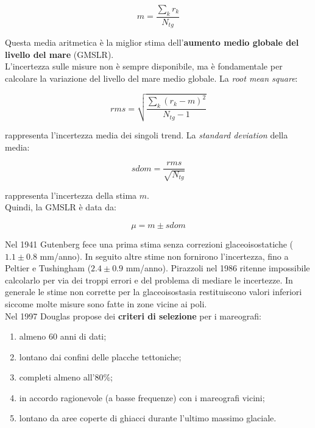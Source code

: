 \documentclass[a4paper,12pt]{book}
\begin{document}
\begin{equation}
    m=\frac{\sum_kr_k}{N_{tg}}
\end{equation}

\noindent
Questa media aritmetica è la miglior stima dell'\textbf{aumento medio globale del livello del mare} (GMSLR).\\

\noindent
L'incertezza sulle misure non è sempre disponibile, ma è fondamentale per calcolare la variazione del livello del mare medio globale.
La \textit{root mean square}:

\begin{equation}
    rms = \sqrt{\frac{\sum_k (r_k - m)^2}{N_{tg} - 1}}
\end{equation}

\noindent
rappresenta l'incertezza media dei singoli trend.
La \textit{standard deviation} della media:

\begin{equation}
    sdom=\frac{rms}{\sqrt{N_{tg}}}
\end{equation}

\noindent
rappresenta l'incertezza della stima $m$.\\

\noindent
Quindi, la GMSLR è data da:

\begin{equation}
    \mu = m \pm sdom
\end{equation}

\noindent
Nel 1941 Gutenberg fece una prima stima senza correzioni glaceoisostatiche ($1.1 \pm 0.8$ mm/anno).
In seguito altre stime non fornirono l'incertezza, fino a Peltier e Tushingham ($2.4 \pm 0.9$ mm/anno).
Pirazzoli nel 1986 ritenne impossibile calcolarlo per via dei troppi errori e del problema di mediare le incertezze.
In generale le stime non corrette per la glaceoisostasia restituiscono valori inferiori siccome molte misure sono fatte in zone vicine ai poli.\\

\noindent
Nel 1997 Douglas propose dei \textbf{criteri di selezione} per i mareografi:

\begin{enumerate}
    \item almeno 60 anni di dati;
    \item lontano dai confini delle placche tettoniche;
    \item completi almeno all'80\%;
    \item in accordo ragionevole (a basse frequenze) con i mareografi vicini;
    \item lontano da aree coperte di ghiacci durante l'ultimo massimo glaciale.
\end{enumerate}
\end{document}
